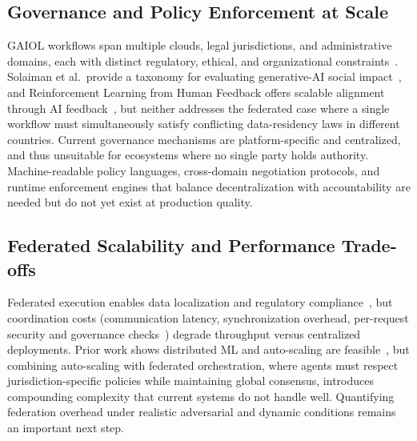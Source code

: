 \documentclass{iopjournal}
\begin{document}
\subsection{Governance and Policy Enforcement at Scale}

GAIOL workflows span multiple clouds, legal jurisdictions, and administrative domains, each with distinct regulatory, ethical, and organizational constraints~\cite{FM_Governance, FedLearn, MaasGovernance}. Solaiman et al.\ provide a taxonomy for evaluating generative-AI social impact~\cite{SafetyTaxonomy_FAccT23}, and Reinforcement Learning from Human Feedback offers scalable alignment through AI feedback~\cite{RLAIF_NeurIPS23}, but neither addresses the federated case where a single workflow must simultaneously satisfy conflicting data-residency laws in different countries. Current governance mechanisms are platform-specific and centralized, and thus unsuitable for ecosystems where no single party holds authority. Machine-readable policy languages, cross-domain negotiation protocols, and runtime enforcement engines that balance decentralization with accountability are needed but do not yet exist at production quality.

\subsection{Federated Scalability and Performance Trade-offs}

Federated execution enables data localization and regulatory compliance~\cite{FedLearn}, but coordination costs (communication latency, synchronization overhead, per-request security and governance checks~\cite{NISTZTA}) degrade throughput versus centralized deployments. Prior work shows distributed ML and auto-scaling are feasible~\cite{FedML_MLSys22, Autoscaling_MAS}, but combining auto-scaling with federated orchestration, where agents must respect jurisdiction-specific policies while maintaining global consensus, introduces compounding complexity that current systems do not handle well. Quantifying federation overhead under realistic adversarial and dynamic conditions remains an important next step.
\end{document}

